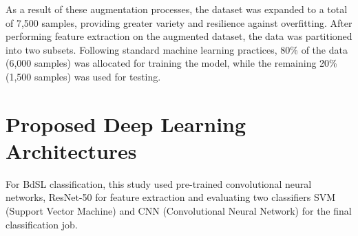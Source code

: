 
As a result of these augmentation processes, the dataset was expanded to a total of 7,500 samples, providing greater variety and resilience against overfitting. After performing feature extraction on the augmented dataset, the data was partitioned into two subsets. Following standard machine learning practices, 80\% of the data (6,000 samples) was allocated for training the model, while the remaining 20\% (1,500 samples) was used for testing.

\newpage
\section{Proposed Deep Learning Architectures}
\label{sec:sec3_3}
For BdSL classification, this study used pre-trained convolutional neural networks, ResNet-50 for feature extraction and evaluating two classifiers SVM (Support Vector Machine) and CNN (Convolutional Neural Network) for the final classification job.

